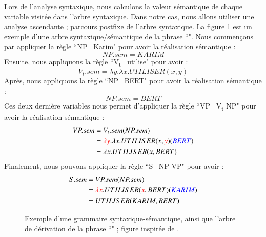 \documentclass{KodeBook}
\begin{document}
Lors de l'analyse syntaxique, nous calculons la valeur sémantique de chaque variable visitée dans l'arbre syntaxique.
Dans notre cas, nous allons utiliser une analyse ascendante ; parcours postfixe de l'arbre syntaxique.
La figure \ref{fig:arbre-sem1} est un exemple d'une arbre syntaxique/sémantique de la phrase ``".
Nous commençons par appliquer la règle ``NP \textrightarrow\ Karim" pour avoir la réalisation sémantique : 
\[NP.sem = KARIM\]
Ensuite, nous appliquons la règle ``V\textsubscript{t} \textrightarrow\ utilise" pour avoir :
\[V_t.sem = \lambda y.\lambda x.UTILISER(x, y)\]
Après, nous appliquons la règle ``NP \textrightarrow\ BERT" pour avoir la réalisation sémantique : 
\[NP.sem = BERT\]
Ces deux dernière variables nous permet d'appliquer la règle ``VP \textrightarrow\ V\textsubscript{t} NP" pour avoir la réalisation sémantique :
\begin{align*}
 VP.sem & = V_t.sem(NP.sem) \\
        & = \textcolor{red}{\lambda y}.\lambda x.UTILISER(x, \textcolor{red}{y})(\textcolor{blue}{BERT})\\
        & = \lambda x.UTILISER(x, BERT)
\end{align*}
Finalement, nous pouvons appliquer la règle ``S \textrightarrow\ NP VP" pour avoir :
\begin{align*}
S.sem & = VP.sem(NP.sem) \\
       & = \textcolor{red}{\lambda x}.UTILISER(\textcolor{red}{x}, BERT)(\textcolor{blue}{KARIM})\\
       & = UTILISER(KARIM, BERT)
\end{align*}

\begin{figure}[ht]
	\centering
	\caption[Exemple d'une grammaire syntaxique-sémantique et une dérivation.]{Exemple d'une grammaire syntaxique-sémantique, ainsi que l'arbre de dérivation de la phrase ``" ; figure inspirée de \cite{2018-eisenstein}.}
	\label{fig:arbre-sem1}
\end{figure}
\end{document}
